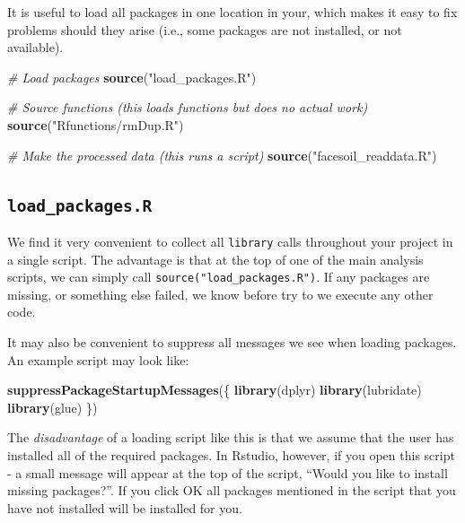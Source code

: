 \documentclass[]{book}
\newenvironment{Shaded}{\begin{snugshade}}{\end{snugshade}}
\newcommand{\CommentTok}[1]{\textcolor[rgb]{0.56,0.35,0.01}{\textit{#1}}}
\newcommand{\KeywordTok}[1]{\textcolor[rgb]{0.13,0.29,0.53}{\textbf{#1}}}
\newcommand{\NormalTok}[1]{#1}
\newcommand{\StringTok}[1]{\textcolor[rgb]{0.31,0.60,0.02}{#1}}
\begin{document}
It is useful to load all packages in one location in your, which makes it easy to fix problems should they arise (i.e., some packages are not installed, or not available).

\begin{Shaded}
\begin{Highlighting}[]
\CommentTok{# Load packages}
\KeywordTok{source}\NormalTok{(}\StringTok{"load_packages.R"}\NormalTok{)}

\CommentTok{# Source functions (this loads functions but does no actual work)}
\KeywordTok{source}\NormalTok{(}\StringTok{"Rfunctions/rmDup.R"}\NormalTok{)}

\CommentTok{# Make the processed data (this runs a script)}
\KeywordTok{source}\NormalTok{(}\StringTok{"facesoil_readdata.R"}\NormalTok{)}
\end{Highlighting}
\end{Shaded}

\hypertarget{load_packages.r}{%
\subsection{\texorpdfstring{\texttt{load\_packages.R}}{load\_packages.R}}\label{load_packages.r}}

We find it very convenient to collect all \texttt{library} calls throughout your project in a single script. The advantage is that at the top of one of the main analysis scripts, we can simply call \texttt{source("load\_packages.R")}. If any packages are missing, or something else failed, we know before try to we execute any other code.

It may also be convenient to suppress all messages we see when loading packages. An example script may look like:

\begin{Shaded}
\begin{Highlighting}[]
\KeywordTok{suppressPackageStartupMessages}\NormalTok{(\{}
  \KeywordTok{library}\NormalTok{(dplyr)}
  \KeywordTok{library}\NormalTok{(lubridate)}
  \KeywordTok{library}\NormalTok{(glue)}
\NormalTok{\})}
\end{Highlighting}
\end{Shaded}

The \emph{disadvantage} of a loading script like this is that we assume that the user has installed all of the required packages. In Rstudio, however, if you open this script - a small message will appear at the top of the script, ``Would you like to install missing packages?''. If you click OK all packages mentioned in the script that you have not installed will be installed for you.
\end{document}
